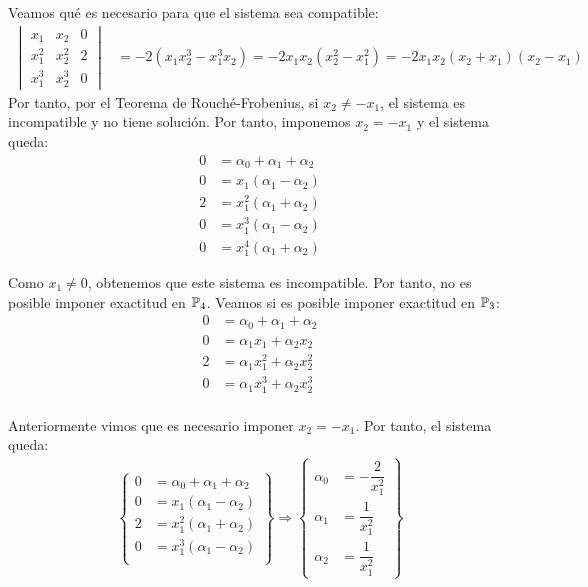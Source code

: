 \begin{ejercicio}
\begin{enumerate}
        Veamos qué es necesario para que el sistema sea compatible:
        \begin{align*}
            \begin{vmatrix}
                x_1 & x_2 & 0 \\
                x_1^2 & x_2^2 & 2 \\
                x_1^3 & x_2^3 & 0
            \end{vmatrix} &= -2\left(x_1x_2^3-x_1^3x_2\right) = -2x_1x_2(x_2^2-x_1^2) = -2x_1x_2(x_2+x_1)(x_2-x_1)
        \end{align*}
        Por tanto, por el Teorema de Rouché-Frobenius, si $x_2\neq -x_1$, el sistema es incompatible y no tiene solución. Por tanto, imponemos $x_2=-x_1$ y el sistema queda:
        \begin{align*}
            0 &= \alpha_0 + \alpha_1 + \alpha_2 \\
            0 &= x_1(\alpha_1- \alpha_2) \\
            2 &= x_1^2(\alpha_1 + \alpha_2) \\
            0 &= x_1^3(\alpha_1 - \alpha_2)\\
            0 &= x_1^4(\alpha_1 + \alpha_2)
        \end{align*}

        Como $x_1\neq 0$, obtenemos que este sistema es incompatible. Por tanto, no es posible imponer exactitud en $\mathbb{P}_4$. Veamos si es posible imponer exactitud en $\mathbb{P}_3$:
        \begin{align*}
            0 &= \alpha_0 + \alpha_1 + \alpha_2 \\
            0 &= \alpha_1x_1 + \alpha_2x_2 \\
            2 &= \alpha_1x_1^2 + \alpha_2x_2^2 \\
            0 &= \alpha_1x_1^3 + \alpha_2x_2^3\\
        \end{align*}

        Anteriormente vimos que es necesario imponer $x_2=-x_1$. Por tanto, el sistema queda:
        \begin{align*}
            \left\{
                \begin{array}{rl}
                    0 &= \alpha_0 + \alpha_1 + \alpha_2 \\
                    0 &= x_1(\alpha_1- \alpha_2) \\
                    2 &= x_1^2(\alpha_1 + \alpha_2) \\
                    0 &= x_1^3(\alpha_1 - \alpha_2)\\
                \end{array}
            \right\}
            \Longrightarrow
            \left\{
                \begin{array}{rl}
                    \alpha_0 &= -\dfrac{2}{x_1^2} \\
                    \alpha_1 &= \dfrac{1}{x_1^2} \\
                    \alpha_2 &= \dfrac{1}{x_1^2}
                \end{array}
            \right\}
        \end{align*}


\end{enumerate}
\end{ejercicio}
